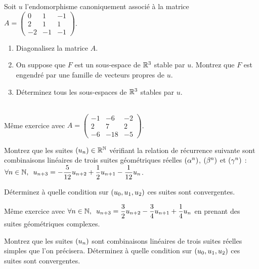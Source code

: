 \begin{exoss}[Exercice 15]
Soit \(u\) l'endomorphisme canoniquement associé à la matrice \(A=\begin{pmatrix}
0 & 1 & -1 \\
2 & 1 & 1 \\
-2 & -1 & -1
\end{pmatrix}\).

\begin{enumerate}
    \item Diagonalisez la matrice \(A\). \\
    \item On suppose que \(F\) est un sous-espace de \(\mathbb{R}^3\) stable par \(u\). Montrez que \(F\) est engendré par une famille de vecteurs propres de \(u\). \\
    \item Déterminez tous les sous-espaces de \(\mathbb{R}^3\) stables par \(u\).
\end{enumerate}
\end{exoss}



\begin{exos}[Exercice 16]~\\
Même exercice avec \(A=\begin{pmatrix}
-1 & -6 & -2 \\
2 & 7 & 2 \\
-6 & -18 & -5
\end{pmatrix}\).
\end{exos}



\begin{exos}[Exercice 17]
Montrez que les suites \(\left(u_n\right)\in\mathbb{R}^{\mathbb{N}}\) vérifiant la relation de récurrence suivante sont combinaisons linéaires de trois suites géométriques réelles \(\left(\alpha^n\right)\), \(\left(\beta^n\right)\) et \(\left(\gamma^n\right)\) : \(\quantifs{\forall n\in\N}u_{n+3}=-\dfrac{5}{12}u_{n+2}+\dfrac{1}{2}u_{n+1}-\dfrac{1}{12}u_n\).

Déterminez à quelle condition sur \(\left(u_0,u_1,u_2\right)\) ces suites sont convergentes.
\end{exos}



\begin{exos}[Exercice 18]
Même exercice avec \(\quantifs{\forall n\in\N}u_{n+3}=\dfrac{3}{2}u_{n+2}-\dfrac{3}{4}u_{n+1}+\dfrac{1}{4}u_n\) en prenant des suites géométriques complexes.

Montrez que les suites \(\left(u_n\right)\) sont combinaisons linéaires de trois suites réelles simples que l'on précisera. Déterminez à quelle condition sur \(\left(u_0,u_1,u_2\right)\) ces suites sont convergentes.
\end{exos}




